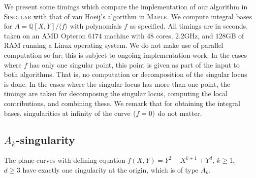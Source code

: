 \documentclass[a4paper,11pt]{amsart}%
\theoremstyle{definition}
\theoremstyle{plain}
\theoremstyle{remark}
\begin{document}
\label{sec timings}

We present some timings which compare the implementation of our algorithm
 in \textsc{Singular}{} with that of van Hoeij's
algorithm in \textsc{Maple}. We compute integral bases for $A=\mathbb{Q}%
[X,Y]/\langle f\rangle$ with polynomials $f$ as specified. All timings are in
seconds, taken on an AMD Opteron $6174$ machine with $48$ cores, $2.2$GHz, and
$128$GB of RAM running a Linux operating system. We do not make use of
parallel computation so far; this is subject to ongoing implementation work.
In the cases where $f$ has only one singular point, this point is given as
part of the input to both algorithms. That is, no computation or decomposition
of the singular locus is done. In the cases where the singular locus has more
than one point, the timings are taken for decomposing the singular locus,
computing the local contributions, and combining these.
We remark that for obtaining the integral bases, singularities at infinity of
the curve $\{f=0\}$ do not matter.


\subsection{\texorpdfstring{$A_{k}$}{Ak}-singularity}

The plane curves with defining equation $f(X,Y)=Y^{2}+X^{k+1}+Y^{d}$, $k\geq
1$, $d\geq3$ have exactly one singularity at the origin, which is of type
$A_{k}$.

%
\end{document}
